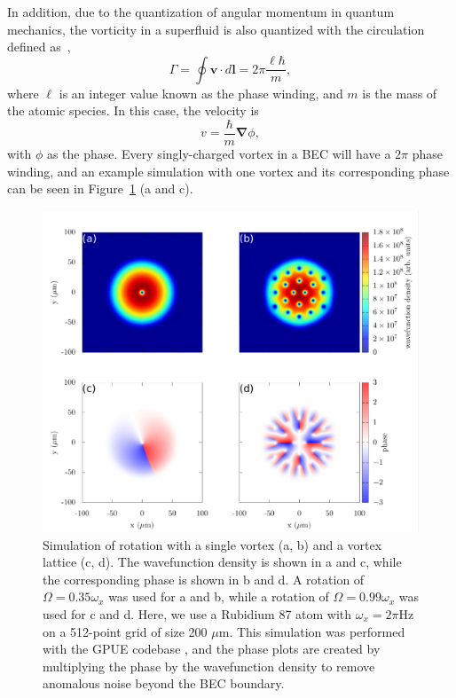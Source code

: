 In addition, due to the quantization of angular momentum in quantum mechanics, the vorticity in a superfluid is also quantized with the circulation defined as~\cite{pethick2002},
\begin{equation}
\Gamma = \oint\mathbf{v} \cdot d \mathbf{l} = 2\pi \frac{\ell \hbar}{m},
\label{Eq:phase}
\end{equation}
where $\ell$ is an integer value known as the phase winding, and $m$ is the mass of the atomic species.
In this case, the velocity is
\begin{equation}
v = \frac{\hbar}{m}\mathbf{\nabla}\phi,
\end{equation}
with $\phi$ as the phase.
Every singly-charged vortex in a BEC will have a $2\pi$ phase winding, and an example simulation with one vortex and its corresponding phase can be seen in Figure~\ref{fig:rot} (a and c).

\begin{figure}

\includegraphics[width=\textwidth]{data/splitop/rot/WIP.pdf}

\caption{
Simulation of rotation with a single vortex (a, b) and a vortex lattice (c, d).
The wavefunction density is shown in a and c, while the corresponding phase is shown in b and d.
A rotation of $\Omega = 0.35\omega_x$ was used for a and b, while a rotation of $\Omega = 0.99\omega_x$ was used for c and d.
Here, we use a Rubidium 87 atom with $\omega_x = 2\pi$Hz on a 512-point grid of size 200 $\mu$m.
This simulation was performed with the GPUE codebase \cite{schloss2018}, and the phase plots are created by multiplying the phase by the wavefunction density to remove anomalous noise beyond the BEC boundary.
}
\label{fig:rot}
\end{figure}

